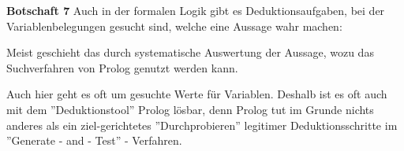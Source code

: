 \documentclass[a4paper]{article}
\renewcommand{\note}[2]{\begin{noteBox} \textbf{#1} #2 \end{noteBox}}
\begin{document}
\begin{multicols}{3}
  \note{Botschaft 7}{Auch in der formalen Logik gibt es Deduktionsaufgaben, bei der Variablenbelegungen gesucht sind, welche eine Aussage wahr machen:
    \begin{enumerate*}
      \item Meist geschieht das durch systematische Auswertung der Aussage, wozu das Suchverfahren von Prolog genutzt werden kann.
      \item Auch hier geht es oft um gesuchte Werte für Variablen. Deshalb ist es oft auch mit dem ''Deduktionstool'' Prolog lösbar, denn Prolog tut im Grunde nichts anderes als ein ziel-gerichtetes ''Durchprobieren'' legitimer Deduktionsschritte im ''Generate - and - Test'' - Verfahren.
    \end{enumerate*}
  }

\end{multicols}
\end{document}
